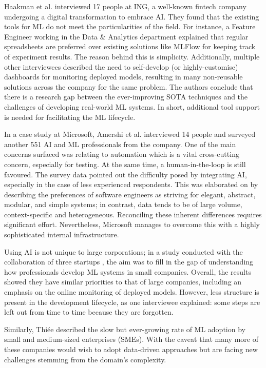 Haakman et al. \cite{haakman2021ai} interviewed 17 people at ING, a well-known fintech company undergoing a digital transformation to embrace AI. They found that the existing tools for ML do not meet the particularities of the field. For instance, a Feature Engineer working in the Data \& Analytics department explained that regular spreadsheets are preferred over existing solutions like MLFlow for keeping track of experiment results. The reason behind this is simplicity. Additionally, multiple other interviewees described the need to self-develop (or highly-customise) dashboards for monitoring deployed models, resulting in many non-reusable solutions across the company for the same problem. The authors conclude that there is a research gap between the ever-improving SOTA techniques and the challenges of developing real-world ML systems. In short, additional tool support is needed for facilitating the ML lifecycle.

In a case study at Microsoft, Amershi et al. \cite{amershi2019software} interviewed 14 people and surveyed another 551 AI and ML professionals from the company. One of the main concerns surfaced was relating to automation which is a vital cross-cutting concern, especially for testing. At the same time, a human-in-the-loop is still favoured. The survey data pointed out the difficulty posed by integrating AI, especially in the case of less experienced respondents. This was elaborated on by describing the preferences of software engineers as striving for elegant, abstract, modular, and simple systems; in contrast, data tends to be of large volume, context-specific and heterogeneous. Reconciling these inherent differences requires significant effort. Nevertheless, Microsoft manages to overcome this with a highly sophisticated internal infrastructure.

Using AI is not unique to large corporations; in a study conducted with the collaboration of three startups \cite{de2019understanding}, the aim was to fill in the gap of understanding how professionals develop ML systems in small companies. Overall, the results showed they have similar priorities to that of large companies, including an emphasis on the online monitoring of deployed models. However, less structure is present in the development lifecycle, as one interviewee explained: some steps are left out from time to time because they are forgotten.

Similarly, Thiée \cite{thiee2021systematic} described the slow but ever-growing rate of ML adoption by small and medium-sized enterprises (SMEs). With the caveat that many more of these companies would wish to adopt data-driven approaches but are facing new challenges stemming from the domain's complexity.

